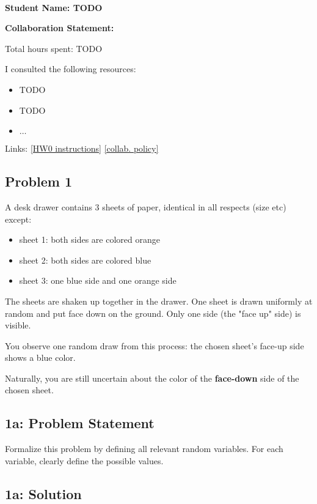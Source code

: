 \documentclass[10pt]{article}
\newcommand{\officialdirections}[1]{{\color{purple} #1}}
\begin{document}
~~\\ %

{\Large{\bf Student Name: TODO}}

\Large{\bf Collaboration Statement:}

Total hours spent: TODO

I consulted the following resources:
\begin{itemize}
\item TODO
\item TODO
\item $\ldots$	
\end{itemize}

Links: 
\href{https://www.cs.tufts.edu/cs/136/2024s/hw0.html}{[HW0 instructions]} 
\href{https://www.cs.tufts.edu/cs/136/2024s/index.html#collaboration}{[collab. policy]} 

\tableofcontents

\newpage
\officialdirections{
\subsection*{Problem 1}
A desk drawer contains 3 sheets of paper, identical in all respects (size etc) except:

\begin{itemize}
\item sheet 1: both sides are colored orange
\item sheet 2: both sides are colored blue
\item sheet 3: one blue side and one orange side
\end{itemize}

The sheets are shaken up together in the drawer. One sheet is drawn uniformly at random and put face down on the ground. Only one side (the "face up" side) is visible.

You observe one random draw from this process: the chosen sheet's face-up side shows a blue color.

Naturally, you are still uncertain about the color of the \textbf{face-down} side of the chosen sheet.
}

\officialdirections{
\subsection*{1a: Problem Statement}
Formalize this problem by defining all relevant random variables. For each variable, clearly define the possible values.
}
\subsection{1a: Solution}
\end{document}
